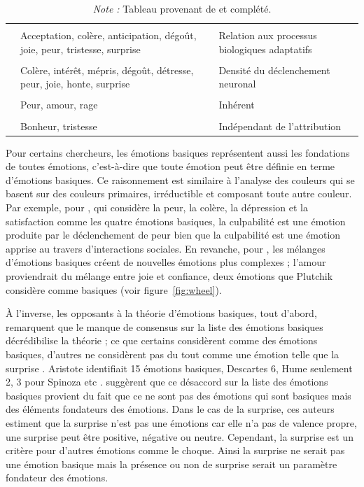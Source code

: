 \documentclass[a4paper,12pt, openany]{book}
\begin{document}
\begin{table}[!ht]
\begin{tabular}{p{4cm} p{7cm} p{4.3cm}}
        &&\\
        \raggedright \textcite{plutchik80a} & \raggedright Acceptation, colère, anticipation, dégoût, joie, peur, tristesse, surprise & \raggedright Relation aux processus biologiques adaptatifs \tabularnewline
        &&\\
        \raggedright \textcite{tomkins84} & \raggedright Colère, intérêt, mépris, dégoût, détresse, peur, joie, honte, surprise & \raggedright Densité du déclenchement neuronal \tabularnewline
        &&\\
        \raggedright \textcite{watson30} & \raggedright Peur, amour, rage & \raggedright Inhérent \tabularnewline
        &&\\
        \raggedright \textcite{weiner84} & \raggedright Bonheur, tristesse & \raggedright Indépendant de l'attribution \tabularnewline
        \hline

    \end{tabular}
	\caption*{\small \textit{Note :} Tableau provenant de \textcite{ortony90} et complété.}
\end{table}


Pour certains chercheurs, les émotions basiques représentent aussi les fondations de toutes émotions, c'est-à-dire que toute émotion peut être définie en terme d'émotions basiques. Ce raisonnement est similaire à l'analyse des couleurs qui se basent sur des couleurs primaires, irréductible et composant toute autre couleur. Par exemple, pour \textcite{kemper87}, qui considère la peur, la colère, la dépression et la satisfaction comme les quatre émotions basiques, la culpabilité est une émotion produite par le déclenchement de peur bien que la culpabilité est une émotion apprise au travers d'interactions sociales. En revanche, pour \textcite{plutchik80}, les mélanges d'émotions basiques créent de nouvelles émotions plus complexes ; l'amour proviendrait du mélange entre joie et confiance, deux émotions que Plutchik considère comme basiques (voir figure~\ref{fig:wheel}). \par 


À l'inverse, les opposants à la théorie d'émotions basiques, tout d'abord, remarquent que le manque de consensus sur la liste des émotions basiques décrédibilise la théorie ; ce que certains considèrent comme des émotions basiques, d'autres ne considèrent pas du tout comme une émotion telle que la surprise \parencite{ortony90}. Aristote identifiait 15 émotions basiques, Descartes 6, Hume seulement 2, 3 pour Spinoza etc \parencite{thamm06}. \textcite{ortony90} suggèrent que ce désaccord sur la liste des émotions basiques provient du fait que ce ne sont pas des émotions qui sont basiques mais des éléments fondateurs des émotions. Dans le cas de la surprise, ces auteurs estiment que la surprise n'est pas une émotions car elle n'a pas de valence propre, une surprise peut être positive, négative ou neutre. Cependant, la surprise est un critère pour d'autres émotions comme le choque. Ainsi la surprise ne serait pas une émotion basique mais la présence ou non de surprise serait un paramètre fondateur des émotions. \par 
\end{document}
